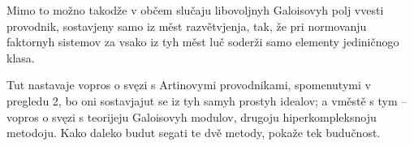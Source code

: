 \documentclass[11pt]{article}
\begin{document}
Mimo to možno takodže v občem slučaju libovoljnyh Galoisovyh polj vvesti provodnik, sostavjeny samo iz měst razvětvjenja, tak, že pri normovanju faktornyh sistemov za vsako iz tyh měst luč soderži samo elementy jediničnogo klasa.

Tut nastavaje vopros o svęzi s Artinovymi provodnikami, spomenutymi v pregledu 2, bo oni sostavjajut se iz tyh samyh prostyh idealov; a vměstě s tym -- vopros o svęzi s teorijeju Galoisovyh modulov, drugoju hiperkompleksnoju metodoju. Kako daleko budut segati te dvě metody, pokaže tek budučnost.
\end{document}
